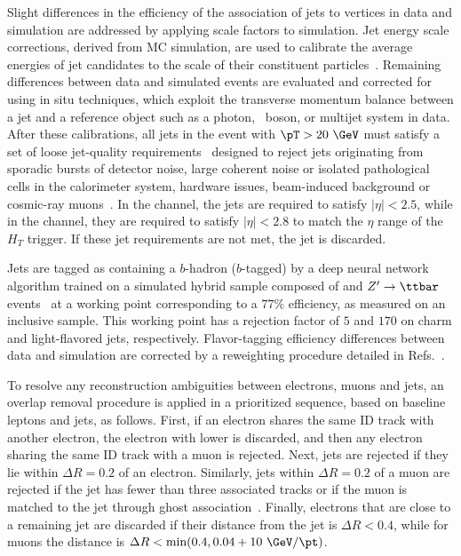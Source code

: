 Slight differences in the efficiency of the association of jets to vertices in data and simulation are addressed by applying scale factors to simulation. Jet energy scale corrections, derived from MC simulation, are used to calibrate the average energies of jet candidates to the scale of their constituent particles~\cite{JETM-2018-05}. Remaining differences between data and simulated events are evaluated and corrected for using in situ techniques, which exploit the transverse momentum balance between a jet and a reference object such as a photon, \Zboson\ boson, or multijet system in data. After these calibrations, all jets in the event with $\pT > 20~\GeV$ must satisfy a set of loose jet-quality requirements~\cite{DAPR-2012-01} designed to reject jets originating from sporadic bursts of detector noise, large coherent noise or isolated pathological cells in the calorimeter system, hardware issues, beam-induced background or cosmic-ray muons~\cite{ATLAS-CONF-2015-029}. 
In the \onelep channel, the jets are required to satisfy $|\eta|<2.5$, while in the  \allhad channel, they are required to satisfy $|\eta|<2.8$ to match the $\eta$ range of the $H_T$ trigger. If these jet requirements are not met, the jet is discarded. 

Jets are tagged as containing a $b$-hadron ($b$-tagged) by a deep neural network algorithm trained on a simulated hybrid sample composed of \ttbar and $Z'\rightarrow\ttbar$ events~\cite{FTAG-2019-07,ATL-PHYS-PUB-2017-013} at a working point corresponding to a $77\%$ \bjet efficiency, as measured on an inclusive \ttbar sample. This working point has a rejection factor of $5$ and $170$ on charm and light-flavored jets, respectively. 
Flavor-tagging efficiency differences between data and simulation are corrected by a reweighting procedure detailed in Refs.~\cite{FTAG-2018-01,FTAG-2019-02,FTAG-2020-08}.

To resolve any reconstruction ambiguities between electrons, muons and jets, an overlap removal procedure is applied in a prioritized sequence, based on baseline leptons and jets, as follows. First, if an electron shares the same ID track with another electron, the electron with lower \pt is discarded, and then any electron sharing the same ID track with a muon is rejected. 
Next, jets are rejected if they lie within $\Delta R = 0.2$ of an electron. Similarly, jets within $\Delta R = 0.2$ of a muon are rejected if the jet has fewer than three associated tracks or if the muon is matched to the jet through ghost association~\cite{Cacciari:2008gp}. Finally, electrons that are close to a remaining jet are discarded if their distance from the jet is $\Delta R < 0.4$, while for muons the distance is $\Delta R < \text{min}(0.4, 0.04 + 10~\GeV/\pt)$.

